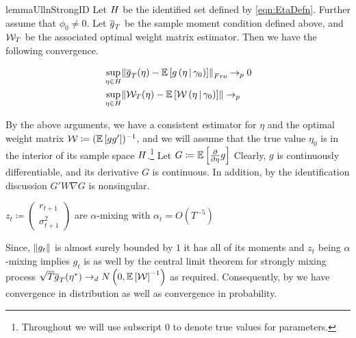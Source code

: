 \documentclass[11pt, letterpaper, twoside, final]{article}
\begin{document}
\begin{restatable}{lemma}{UllnStrongID}
    \label{lemma:UniformConvergenceStrongID}
    Let $\Eta$ be the identified set defined by \cref{eqn:EtaDefn}.
    Further assume that $\phi_0 \neq 0$. 
    Let $\sampmom$ be the sample moment condition defined above, and $\W_T$ be the associated optimal weight matrix
    estimator.
    Then we have the following convergence.

    \begin{align}
        &\sup_{\eta \in \Eta} \norm*{\sampmom(\eta) - \E\left[g\left(\eta \mvert \gamma_0\right)\right]}_{Fro}
          \pto 0 \\ 
        &\sup_{\eta \in \Eta} \norm{\W_{T}(\eta)-\E\left[\W\left(\eta \mvert \gamma_0\right)\right]} \pto 
    \end{align}

\end{restatable}



By the above arguments, we have a consistent estimator for $\eta$ and the optimal weight matrix $\W \coloneqq
(\E\left[g g'\right])^{-1}$, and we will assume that the true value $\eta_{0}$ is in the interior of its sample
space $\Eta$.\footnote{Throughout we will use subscript \num{0}  to denote true values for parameters.}
Let $G \coloneqq \E\left[\frac{\partial}{\partial \eta} \popmom \right]$
Clearly, $g$ is continuously differentiable, and its derivative $G$ is continuous.
In addition, by the identification discussion $G' W \nabla G$ is nonsingular.


\begin{assump}
    \label{assumption:weak_dependence}
    $z_t \coloneqq \begin{pmatrix} r_{t+1} \\ \sigma^2_{t+1} \end{pmatrix}$ are $\alpha$-mixing with $\alpha_t =
       O\left(T^{-5}\right)$
\end{assump}

Since, $\norm*{g_t}$ is almost surely bounded by $1$ it has all of its moments and $z_t$ being $\alpha$-mixing
implies $g_t$ is as well by the central limit theorem for strongly mixing process 
$\sqrt{T} \sampmom(\eta^{*}) \dto \N\left(0, \E\left[\W\right]^{-1}\right)$ as required. 
Consequently, by \textcite[theorem 3.2]{newey1994large} we have convergence in distribution as well as convergence
in probability.
\end{document}
